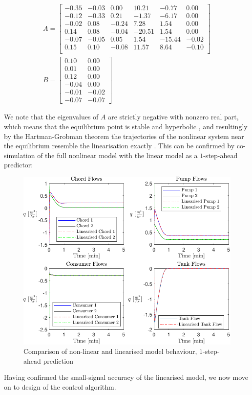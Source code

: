 \begin{equation}\label{eq:LinearisedModelWithTank}
\begin{gathered}
	A = \begin{bmatrix}
		-0.35 & -0.03 & 0.00 & 10.21 & -0.77 & 0.00\\
		-0.12 & -0.33 & 0.21 & -1.37 & -6.17  & 0.00\\
		-0.02 & 0.08 & -0.24 & 7.28 & 1.54 & 0.00\\
		0.14 & 0.08 & -0.04 & -20.51 & 1.54 & 0.00\\
		-0.07 & -0.05 & 0.05 & 1.54 & -15.44 &   -0.02\\
		0.15 & 0.10 & -0.08 & 11.57 & 8.64 & -0.10\\
	\end{bmatrix} \\
	B = \begin{bmatrix}
		0.10 & 0.00\\
		0.01 & 0.00 \\
		0.12 & 0.00 \\
		-0.04 & 0.00 \\
		-0.01 & -0.02\\
		-0.07 & -0.07
	\end{bmatrix}
\end{gathered}
\end{equation}

We note that the eigenvalues of $A$ are strictly negative with nonzero real part, which means that the equilibrium point is stable and hyperbolic \cite{Khalil}, and resultingly by the Hartman-Grobman theorem the trajectories of the nonlinear system near the equilibrium resemble the linearisation exactly \cite{Perko2001}. This can be confirmed by co-simulation of the full nonlinear model with the linear model as a $1$-step-ahead predictor:


\begin{figure}[h]
	\centering
	\includegraphics[width=\linewidth]{Graphics/NominalFlows.pdf}
	\caption{Comparison of non-linear and linearised model behaviour, $1$-step-ahead prediction}
	\label{fig:CompNonlinLin}
\end{figure}

Having confirmed the small-signal accuracy of the linearised model, we now move on to design of the control algorithm.